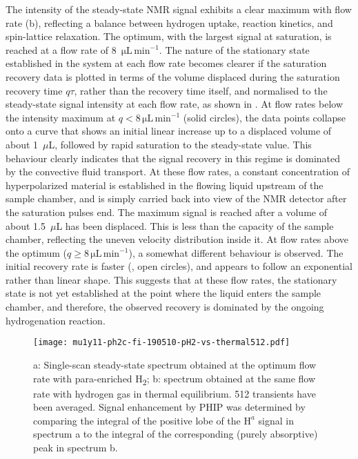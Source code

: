 The intensity of the steady-state NMR signal exhibits a clear maximum with flow
rate (b), reflecting a balance between hydrogen uptake,
reaction kinetics, and spin-lattice relaxation. The optimum, with the largest signal at
saturation, is reached at a flow rate of 8~$\mathrm{\mu L\,\text{min}^{-1}}$.
The nature of the stationary state established in the system at each
flow rate becomes clearer if the saturation recovery data is plotted in terms
of the volume displaced during the saturation recovery time $q\tau$, rather
than the recovery time itself, and normalised to the steady-state signal intensity
at each flow rate, as shown in . At flow rates below
the intensity maximum at $q<8\,\mathrm{\mu L\,\text{min}^{-1}}$ (solid
circles),
the data points collapse onto a curve that shows an initial linear increase
up to a displaced volume of about 1~$\mu$L, followed by rapid saturation to the
steady-state value. This behaviour clearly indicates that the
signal recovery in this regime is dominated by the convective fluid transport.
At these flow rates, a constant concentration of
hyperpolarized material is established in the flowing liquid upstream of the
sample chamber, and is simply carried back into view of the NMR detector
after the saturation pulses end.
The maximum signal is reached after a volume
of about 1.5~$\mu$L has been displaced. This is less than the capacity
of the sample chamber, reflecting the uneven velocity distribution inside it.
At flow rates above the optimum ($q\ge 8\,\mathrm{\mu L\,\text{min}^{-1}}$),
a somewhat different behaviour is observed. The initial recovery rate is
faster (, open circles), and appears to follow
an exponential rather than linear shape. This suggests that at these flow
rates, the stationary state is not yet established at the point where the
liquid enters the sample chamber, and therefore, the observed recovery
is dominated by the ongoing hydrogenation reaction.

\begin{figure}
  \begin{center}
    \texttt{[image: mu1y11-ph2c-fi-190510-pH2-vs-thermal512.pdf]}
  \end{center}
  \caption{	a: Single-scan steady-state spectrum obtained at the optimum flow rate
  	with para-enriched H\textsubscript{2}; b: spectrum obtained at the same flow
    rate with hydrogen gas
  	in thermal equilibrium. 512 transients have been averaged. Signal enhancement by
  	PHIP was determined by comparing the integral of the positive lobe of
    the $\mathrm{H}^a$ signal in spectrum a to the
  	integral of the corresponding (purely absorptive) peak in spectrum b.}
  \label{fig:pH2-vs-thermal512}
\end{figure}

